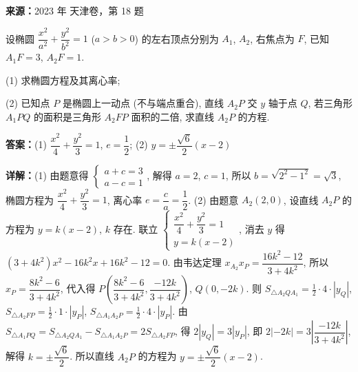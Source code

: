 \begin{question}[points=15]
\textbf{来源：}2023 年 天津卷，第 18 题\par
设椭圆 $\dfrac{x^2}{a^2} + \dfrac{y^2}{b^2} = 1$ ($a > b > 0$) 的左右顶点分别为 $A_1$, $A_2$, 右焦点为 $F$, 已知 $A_1F = 3$, $A_2F = 1$.

(1) 求椭圆方程及其离心率;

(2) 已知点 $P$ 是椭圆上一动点 (不与端点重合), 直线 $A_2P$ 交 $y$ 轴于点 $Q$, 若三角形 $A_1PQ$ 的面积是三角形 $A_2FP$ 面积的二倍, 求直线 $A_2P$ 的方程.
\begin{solution}
\textbf{答案：}(1) $\dfrac{x^2}{4} + \dfrac{y^2}{3} = 1$, $e = \dfrac{1}{2}$; (2) $y = \pm \dfrac{\sqrt{6}}{2}(x-2)$

\textbf{详解：}(1) 由题意得 $\begin{cases} a + c = 3 \\ a - c = 1 \end{cases}$, 解得 $a=2$, $c=1$, 所以 $b = \sqrt{2^2 - 1^2} = \sqrt{3}$, 椭圆方程为 $\dfrac{x^2}{4} + \dfrac{y^2}{3} = 1$, 离心率 $e = \dfrac{c}{a} = \dfrac{1}{2}$.
(2) 由题意 $A_2(2,0)$, 设直线 $A_2P$ 的方程为 $y = k(x-2)$, $k$ 存在. 联立 $\begin{cases} \dfrac{x^2}{4} + \dfrac{y^2}{3} = 1 \\ y = k(x-2) \end{cases}$, 消去 $y$ 得 $(3+4k^2)x^2 - 16k^2 x + 16k^2 - 12 = 0$. 由韦达定理 $x_{A_2} x_P = \dfrac{16k^2 - 12}{3+4k^2}$, 所以 $x_P = \dfrac{8k^2 - 6}{3+4k^2}$, 代入得 $P\left(\dfrac{8k^2 - 6}{3+4k^2}, \dfrac{-12k}{3+4k^2}\right)$, $Q(0, -2k)$. 则 $S_{\triangle A_2QA_1} = \frac{1}{2} \cdot 4 \cdot |y_Q|$, $S_{\triangle A_2FP} = \frac{1}{2} \cdot 1 \cdot |y_P|$, $S_{\triangle A_1A_2P} = \frac{1}{2} \cdot 4 \cdot |y_P|$. 由 $S_{\triangle A_1PQ} = S_{\triangle A_2QA_1} - S_{\triangle A_1A_2P} = 2S_{\triangle A_2FP}$, 得 $2|y_Q| = 3|y_P|$, 即 $2|-2k| = 3\left|\dfrac{-12k}{3+4k^2}\right|$, 解得 $k = \pm \dfrac{\sqrt{6}}{2}$. 所以直线 $A_2P$ 的方程为 $y = \pm \dfrac{\sqrt{6}}{2}(x-2)$.
\end{solution}
\end{question}

